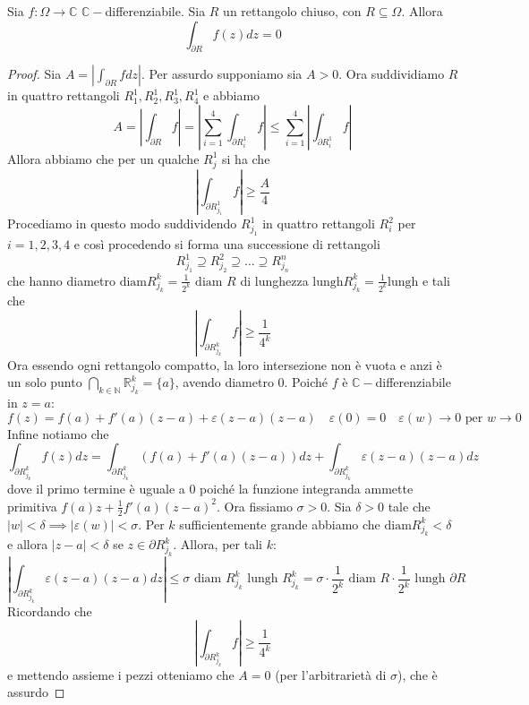 \begin{lemmao}\label{lemma:cauchy_goursat}
    Sia \(f : \Omega \to \mathbb{C}\) \(\mathbb{C}-\)differenziabile. Sia \(R\)
    un rettangolo chiuso, con \(R \subseteq \Omega \). Allora
    \[
        \int_{\partial R} f(z) dz = 0
    \]
\end{lemmao}
\begin{figure}[ht]\label{fig:cauchygoursat}
    \centering
\end{figure}
\begin{proof}
    Sia \(A = \left| \int_{\partial R} f dz \right| \). Per assurdo supponiamo
    sia \(A > 0\). Ora suddividiamo \(R\) in quattro rettangoli \(R^{1}_1,
    R^{1}_2, R^{1}_3, R^{1}_4\) e abbiamo
    \[
        A = \left|\int_{\partial R} f \right|=\left| \sum_{i=1}^{4}
        \int_{\partial R^{1}_i} f \right| \le \sum_{i=1}^{4} \left|
        \int_{\partial R^{1}_i} f \right|
    \]
    Allora abbiamo che per un qualche \(R^{1}_j\) si ha che 
    \[
        \left| \int_{\partial R^{1}_{j_{1}} } f \right| \ge \frac{A}{4}
    \]
    Procediamo in questo modo suddividendo \(R^{1}_{j_1} \) in quattro rettangoli
    \(R^{2}_i\) per \(i = 1, 2, 3, 4\) e così procedendo si forma una
    successione di rettangoli
    \[
        R^{1}_{j_{1}} \supseteq R^{2}_{j_{2}} \supseteq \dots \supseteq
        R^{n}_{j_{n}}
    \]
    che hanno diametro \(\text{diam} R^{k}_{j_k} = \frac{1}{2^{k}} \text{ diam
    }R \) di lunghezza \(\text{lungh} R^{k}_{j_k} = \frac{1}{2^{k}}
    \text{lungh}\) e tali che
    \[
        \left| \int_{\partial R^{k}_{j_k} } f  \right| \ge \frac{1}{4^{k}}
    \]
    Ora essendo ogni rettangolo compatto, la loro intersezione
    non è vuota e anzi è un solo punto \(\bigcap_{k \in \mathbb{N}}
    \mathbb{R}^{k}_{j_k} = \{a\}\), avendo diametro \(0\). Poiché \(f\) è
    \(\mathbb{C}-\)differenziabile in \(z=a\):
    \[
        f(z) = f(a) + f'(a) (z-a) + \varepsilon(z-a)(z-a) \quad \varepsilon(0) =
        0 \quad \varepsilon(w) \to 0 \text{ per } w \to 0
    \]
    Infine notiamo che
    \[
        \int_{\partial R^{k}_{j_k}} f(z) dz = \int_{\partial R^{k}_{j_k} }
        {\left( f(a) + f'{(a)}{(z-a)} \right)} dz + \int_{\partial R^{k}_{j_k} }
        \varepsilon(z-a)(z-a) dz
    \]
    dove il primo termine è uguale a \(0\) poiché la funzione integranda ammette
    primitiva \(f(a)z + \frac{1}{2} f'(a) {(z-a)}^2\). Ora fissiamo \(\sigma >
    0\). Sia \(\delta >0\) tale che \(|w|<\delta \implies
    |\varepsilon(w)|<\sigma\). Per \(k\) sufficientemente grande abbiamo che
    \(\text{diam}R^{k}_{j_k} < \delta  \) e allora \(|z-a|<\delta\) se \(z \in
    \partial R^{k}_{j_k} \). Allora, per tali \(k\):
    \[
        \left| \int_{\partial R^{k}_{j_k} } \varepsilon(z-a) {(z-a)}  dz \right|
        \le \sigma \text{ diam } R^{k}_{j_k} \text{ lungh } R^{k}_{j_k} = \sigma
        \cdot \frac{1}{2^{k}} \text{ diam } R \cdot \frac{1}{2^{k}} \text{ lungh
        }\partial R
    \]
    Ricordando che 
    \[
        \left| \int_{\partial R^{k}_{j_k} } f  \right| \ge \frac{1}{4^{k}}
    \]
    e mettendo assieme i pezzi otteniamo che \(A = 0\) (per l'arbitrarietà di
    \(\sigma\)), che è assurdo
\end{proof}
